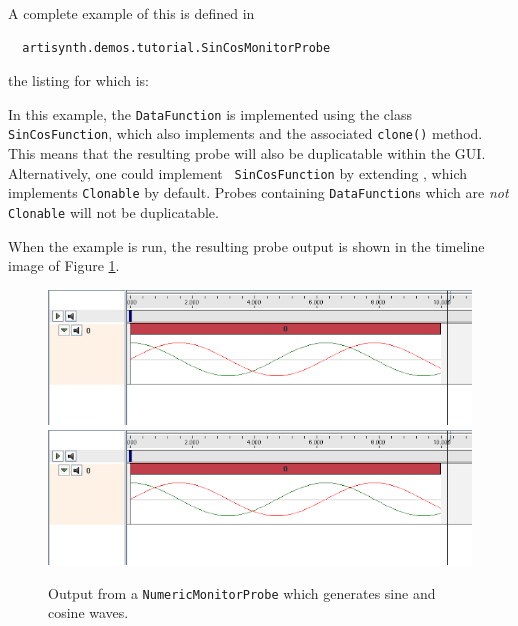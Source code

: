 A complete example
of this is defined in
%
\begin{verbatim}
  artisynth.demos.tutorial.SinCosMonitorProbe
\end{verbatim}
%
the listing for which is:

\lstset{numbers=left}

\lstset{numbers=none}

In this example, the {\tt DataFunction} is implemented using the class
{\tt SinCosFunction}, which also implements
 and the associated {\tt clone()}
method. This means that the resulting probe will also be duplicatable
within the GUI. Alternatively, one could implement {\tt
SinCosFunction} by extending
, which implements
{\tt Clonable} by default. Probes containing {\tt DataFunction}s
which are {\it not} {\tt Clonable} will not be duplicatable.

When the example is run, the resulting probe output is shown in the
timeline image of Figure \ref{sinCosProbe:fig}.

\begin{figure}[ht]
\begin{center}
\iflatexml
 \includegraphics[]{images/sinCosProbe}
\else
 \includegraphics[width=4.5in]{images/sinCosProbe}
\fi
\end{center}
\caption{Output from a {\tt NumericMonitorProbe} which generates sine
and cosine waves.}
\label{sinCosProbe:fig}
\end{figure}

